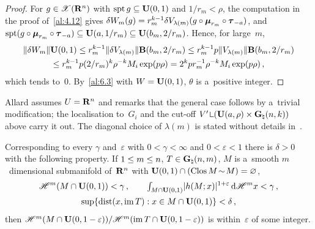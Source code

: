 \begin{proof}
    For $g \in \mathscr{X}(\mathbf{R}^{n})$ with $\operatorname{spt} g \subseteq \mathbf{U}(0,1)$ and $1/r_m < \rho$, the
    computation in the proof of~\ref{al:4.12} gives $\delta W_m(g) = r_m^{k-1} \delta
    V_{\lambda(m)}(g \circ \boldsymbol{\mu}_{r_m} \circ \boldsymbol{\tau}_{-a})$, and $\operatorname{spt}(g \circ \boldsymbol{\mu}_{r_m} \circ
    \boldsymbol{\tau}_{-a}) \subseteq \mathbf{U}(a,1/r_m) \subseteq \mathbf{U}(b_m,2/r_m)$. Hence, for large~$m$,
    \begin{multline*}
        \|\delta W_m\| \mathbf{U}(0,1) \le r_m^{k-1} \|\delta V_{\lambda(m)}\|
        \mathbf{B}(b_m,2/r_m) \le r_m^{k-1} p \|V_{\lambda(m)}\| \mathbf{B}(b_m,2/r_m) \\ \le
        r_m^{k-1} p (2/r_m)^{k} \rho^{-k} M_i \exp(p\rho) = 2^{k} p r_m^{-1}
        \rho^{-k} M_i \exp(p\rho) \,,
    \end{multline*}
    which tends to~$0$. By~\ref{al:6.3} with $W = \mathbf{U}(0,1)$, $\theta$ is a~positive integer.
\end{proof}

\begin{remark}
    \label{rem:6.4}
    Allard assumes $U = \mathbf{R}^{n}$ and remarks that the general case follows by a~trivial
    modification; the localisation to~$G_i$ and the cut-off $V' \restrict (\oball{a}{\rho} \times
    \pgrass{\adim}{\vdim})$ above carry it out. The diagonal choice of $\lambda(m)$ is stated
    without details in~\cite[6.4]{Allard1972}.
\end{remark}

\begin{corollary}
    \label{al:6.4:cor}
    Corresponding to every $\gamma$ and~$\varepsilon$ with $0 < \gamma < \infty$ and $0 <
    \varepsilon < 1$ there is $\delta > 0$ with the following property. If $1 \le m \le n$, $T
    \in \mathbf{G}_{\natural}(n,m)$, $M$ is a~smooth $m$~dimensional submanifold of~$\mathbf{R}^{n}$ with
    $\mathbf{U}(0,1) \cap (\mathop{\mathrm{Clos}}M \!\sim\! M) = \varnothing$,
    \begin{gather*}
        \mathscr{H}^m(M \cap \mathbf{U}(0,1)) < \gamma \,, \qquad {\textstyle\int_{M \cap \mathbf{U}(0,1)}^{}} |h(M;x)|^{1
        + \varepsilon} \,\mathrm{d} \mathscr{H}^m x < \gamma \,, \\ \sup \{ \operatorname{dist}(x, \operatorname{im} T) : x \in M \cap
        \mathbf{U}(0,1) \} < \delta \,,
    \end{gather*}
    then $\mathscr{H}^m(M \cap \mathbf{U}(0,1-\varepsilon)) / \mathscr{H}^m(\operatorname{im} T \cap \mathbf{U}(0,1-\varepsilon))$ is
    within~$\varepsilon$ of some integer.
\end{corollary}

